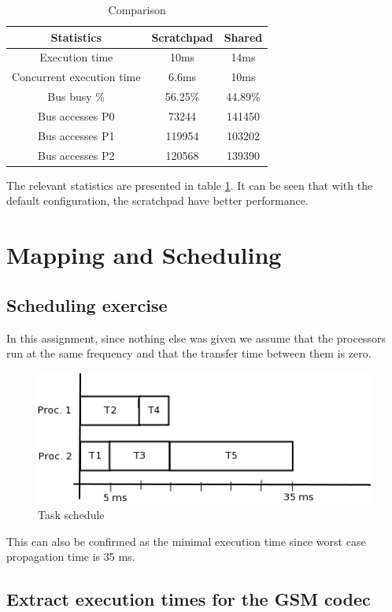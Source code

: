 \documentclass[a4paper, 12pt]{article}
\begin{document}
\begin{table}[h]
  \centering
  \begin{tabular}{c | c c}
    \hline
    Statistics & Scratchpad & Shared \\
    \hline
    Execution time & 10ms & 14ms \\
    Concurrent execution time & 6.6ms & 10ms \\
    Bus busy \% & 56.25\% & 44.89\% \\
    Bus accesses P0 & 73244 & 141450 \\
    Bus accesses P1 & 119954 & 103202 \\
    Bus accesses P2 & 120568 & 139390  \\
    \hline    
  \end{tabular}
  \caption{Comparison}
  \label{fig:comparison}
\end{table}
The relevant statistics are presented in table \ref{fig:comparison}. It can be
seen that with the default configuration, the scratchpad have better
performance.
\section{Mapping and Scheduling}
\subsection{Scheduling exercise}
In this assignment, since nothing else was given we assume that the
processors run at the same frequency and that the transfer time between
them is zero.
\begin{figure}[h]
  \centering
  \includegraphics{taskSchedule.png}
  \caption{Task schedule}
  \label{fig:schedule}
\end{figure}
 This can also be confirmed as the minimal execution time since worst
 case propagation time is 35 ms. 

\subsection{Extract execution times for the GSM codec}
\end{document}
